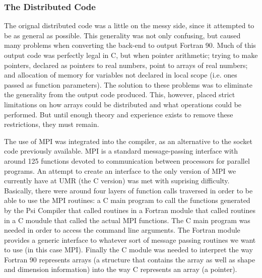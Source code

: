 
\subsubsection{The Distributed Code}
The orignal distributed code was a little on the messy side, since it attempted
to be as general as possible.  This generality was not only confusing,
but caused many problems when converting the back-end to output Fortran
90.  Much of this output code was perfectly legal in C, but when
pointer arithmetic; trying to make pointers, declared as pointers to
real numbers, point to arrays of real numbers; and allocation of memory
for variables not declared in local scope (i.e. ones passed as function
parameters).  The solution to these problems was to eliminate the
generality from the
output code produced.  This, however, placed strict limitations on how
arrays could be distributed and what operations could be performed.
But until enough theory and experience exists to remove these restrictions,
they must remain.

The use of MPI was integrated
into the compiler, as an alternative to the socket code previously 
available. MPI is a standard message-passing interface with around 125
functions devoted to communication between processors for parallel
programs.  An attempt to create an interface to the only version of MPI
we currently have at UMR (the C version) was met with suprising 
difficulty.  Basically, there were around four layers of function
calls traversed in order to be able to use the MPI routines:
a C main program to call the functions
generated by the Psi Compiler that called routines in a Fortran module
that called routines in a C moudule that called the actual MPI functions.
The C main program was needed in order to access the command line
arguments.  The Fortran module provides a generic interface to whatever
sort of message passing routines we want to use (in this case MPI).  
Finally the C module was needed to interpret the way Fortran 90 represents
arrays (a structure that contains the array as well as shape and 
dimension information) into the way C represents an array (a pointer).

